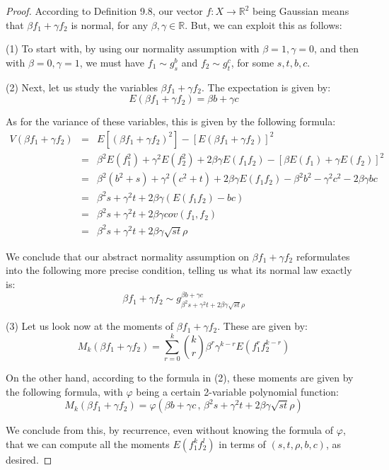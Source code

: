 \documentclass[12pt]{amsbook}
\begin{document}
\begin{proof}
According to Definition 9.8, our vector $f:X\to\mathbb R^2$ being Gaussian means that $\beta f_1+\gamma f_2$ is normal, for any $\beta,\gamma\in\mathbb R$. But, we can exploit this as follows:

\medskip

(1) To start with, by using our normality assumption with $\beta=1,\gamma=0$, and then with $\beta=0,\gamma=1$, we must have $f_1\sim g_s^b$ and $f_2\sim g_t^c$, for some $s,t,b,c$.

\medskip

(2) Next, let us study the variables $\beta f_1+\gamma f_2$. The expectation is given by:
$$E(\beta f_1+\gamma f_2)=\beta b+\gamma c$$

As for the variance of these variables, this is given by the following formula:
\begin{eqnarray*}
V(\beta f_1+\gamma f_2)
&=&E\left[(\beta f_1+\gamma f_2)^2\right]-\left[E(\beta f_1+\gamma f_2)\right]^2\\
&=&\beta^2E(f_1^2)+\gamma^2E(f_2^2)+2\beta\gamma E(f_1f_2)-\left[\beta E(f_1)+\gamma E(f_2)\right]^2\\
&=&\beta^2(b^2+s)+\gamma^2(c^2+t)+2\beta\gamma E(f_1f_2)-\beta^2b^2-\gamma^2c^2-2\beta\gamma bc\\
&=&\beta^2s+\gamma^2t+2\beta\gamma(E(f_1f_2)-bc)\\
&=&\beta^2s+\gamma^2t+2\beta\gamma cov(f_1,f_2)\\
&=&\beta^2s+\gamma^2t+2\beta\gamma\sqrt{st}\rho
\end{eqnarray*}

We conclude that our abstract normality assumption on $\beta f_1+\gamma f_2$ reformulates into the following more precise condition, telling us what its normal law exactly is:
$$\beta f_1+\gamma f_2\sim g^{\beta b+\gamma c}_{\beta^2s+\gamma^2t+2\beta\gamma\sqrt{st}\rho}$$

(3) Let us look now at the moments of $\beta f_1+\gamma f_2$. These are given by:
$$M_k(\beta f_1+\gamma f_2)=\sum_{r=0}^k\binom{k}{r}\beta^r\gamma^{k-r}E(f_1^rf_2^{k-r})$$

On the other hand, according to the formula in (2), these moments are given by the following formula, with $\varphi$ being a certain 2-variable polynomial function:
$$M_k(\beta f_1+\gamma f_2)=\varphi(\beta b+\gamma c\,,\,\beta^2s+\gamma^2t+2\beta\gamma\sqrt{st}\rho)$$

We conclude from this, by recurrence, even without knowing the formula of $\varphi$, that we can compute all the moments $E(f_1^kf_2^l)$ in terms of $(s,t,\rho,b,c)$, as desired.
\end{proof}
\end{document}
